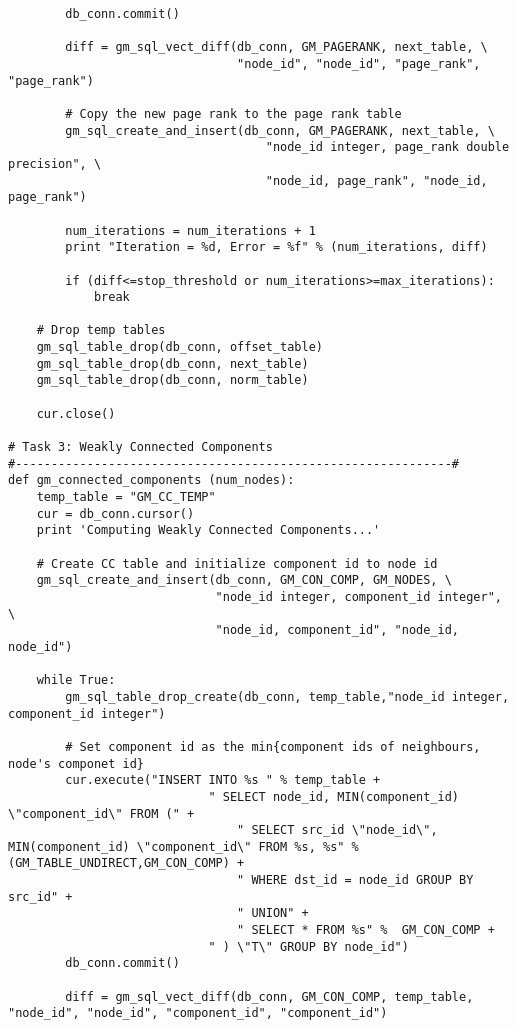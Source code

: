 \begin{lstlisting}
        db_conn.commit()

        diff = gm_sql_vect_diff(db_conn, GM_PAGERANK, next_table, \
                                "node_id", "node_id", "page_rank", "page_rank")

        # Copy the new page rank to the page rank table
        gm_sql_create_and_insert(db_conn, GM_PAGERANK, next_table, \
                                    "node_id integer, page_rank double precision", \
                                    "node_id, page_rank", "node_id, page_rank")

        num_iterations = num_iterations + 1
        print "Iteration = %d, Error = %f" % (num_iterations, diff)

        if (diff<=stop_threshold or num_iterations>=max_iterations):
            break

    # Drop temp tables
    gm_sql_table_drop(db_conn, offset_table)
    gm_sql_table_drop(db_conn, next_table)
    gm_sql_table_drop(db_conn, norm_table)

    cur.close()

# Task 3: Weakly Connected Components
#-------------------------------------------------------------#
def gm_connected_components (num_nodes):
    temp_table = "GM_CC_TEMP"
    cur = db_conn.cursor()
    print 'Computing Weakly Connected Components...'

    # Create CC table and initialize component id to node id
    gm_sql_create_and_insert(db_conn, GM_CON_COMP, GM_NODES, \
                             "node_id integer, component_id integer", \
                             "node_id, component_id", "node_id, node_id")

    while True:
        gm_sql_table_drop_create(db_conn, temp_table,"node_id integer, component_id integer")

        # Set component id as the min{component ids of neighbours, node's componet id}
        cur.execute("INSERT INTO %s " % temp_table +
                            " SELECT node_id, MIN(component_id) \"component_id\" FROM (" +
                                " SELECT src_id \"node_id\", MIN(component_id) \"component_id\" FROM %s, %s" % (GM_TABLE_UNDIRECT,GM_CON_COMP) +
                                " WHERE dst_id = node_id GROUP BY src_id" +
                                " UNION" +
                                " SELECT * FROM %s" %  GM_CON_COMP +
                            " ) \"T\" GROUP BY node_id")
        db_conn.commit()

        diff = gm_sql_vect_diff(db_conn, GM_CON_COMP, temp_table, "node_id", "node_id", "component_id", "component_id")


\end{lstlisting}
